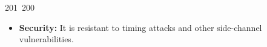 201~200~\documentclass{article}
\begin{document}
\begin{itemize}
	                                                                                                                                                                                                                                                                                                	                                                                                                                                        	    	                                                                                                	                                                                                                                                                                                                                                                                                                                                	                                                                        	                                                                        	                                                                                                                                        	                                                                                                                                                                                                                        	                                                                                                                            	                                                                	                                                                                                                                                                                                        \item \textbf{Security:} It is resistant to timing attacks and other side-channel vulnerabilities.

\end{itemize}
\end{document}
